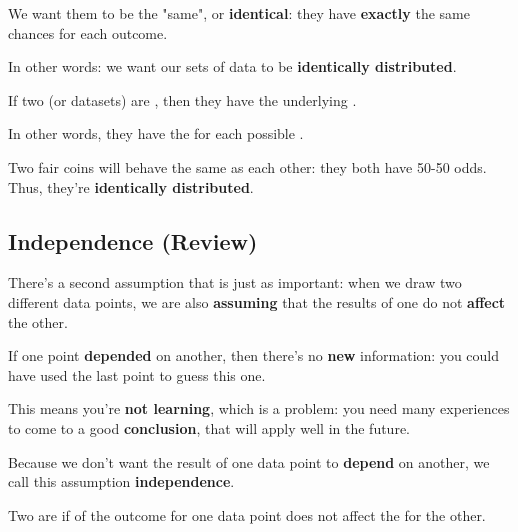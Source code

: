         We want them to be the "same", or \textbf{identical}: they have \textbf{exactly} the same chances for each outcome.
        
        In other words: we want our sets of data to be \textbf{identically distributed}.\\
        
        \begin{definition}
            If two  (or datasets) are , then they have the  underlying .
            
            In other words, they have the   for each possible .
        \end{definition}
        
        \miniex Two fair coins will behave the same as each other: they both have 50-50 odds. Thus, they're \textbf{identically distributed}.
        
        
    \subsection{Independence (Review)}
        
        There's a second assumption that is just as important: when we draw two different data points, we are also \textbf{assuming} that the results of one do not \textbf{affect} the other. 
        
        If one point \textbf{depended} on another, then there's no \textbf{new} information: you could have used the last point to guess this one.
        
        This means you're \textbf{not learning}, which is a problem: you need many experiences to come to a good \textbf{conclusion}, that will apply well in the future.
        
        Because we don't want the result of one data point to \textbf{depend} on another, we call this assumption \textbf{independence}.\\
        
        \begin{definition}
            Two  are  if  of the outcome for one data point does not affect the  for the other.
        \end{definition}
        
        
